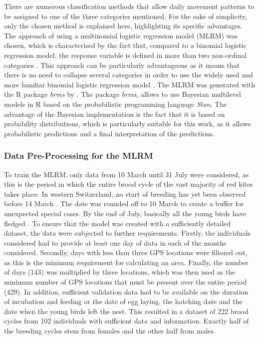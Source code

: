 There are numerous classification methods that allow daily movement patterns to be assigned to one of the three categories mentioned. For the sake of simplicity, only the chosen method is explained here, highlighting its specific advantages. The approach of using a multinomial logistic regression model (MLRM) was chosen, which is characterised by the fact that, compared to a binomial logistic regression model, the response variable is defined in more than two non-ordinal categories \parencite{kwak2002multinomial}. This approach can be particularly advantageous as it means that there is no need to collapse several categories in order to use the widely used and more familiar binomial logistic regression model \parencite{kwak2002multinomial}. The MLRM was generated with the R package \textit{brms} by \textcite{buerkner2017brms}. The package \textit{brms}, allows to use Bayesian multilevel models in R based on the probabilistic programming language \textit{Stan}. The advantage of the Bayesian implementation is the fact that it is based on probability distributions, which is particularly suitable for this work, as it allows probabilistic predictions and a final interpretation of the predictions.



\subsubsection{Data Pre-Processing for the MLRM} \label{subsubsection:mlrm_preprocessing}
To train the MLRM, only data from 10 March until 31 July were considered, as this is the period in which the entire brood cycle of the vast majority of red kites takes place. In western Switzerland, no start of breeding has yet been observed before 14 March \parencite{scherler2023brutbiologie}. The date was rounded off to 10 March to create a buffer for unexpected special cases. By the end of July, basically all the young birds have fledged \parencite{aebischer2021rotmilan}. To ensure that the model was created with a sufficiently detailed dataset, the data were subjected to further requirements. Firstly, the individuals considered had to provide at least one day of data in each of the months considered. Secondly, days with less than three GPS locations were filtered out, as this is the minimum requirement for calculating an area. Finally, the number of days (143) was multiplied by three locations, which was then used as the minimum number of GPS locations that must be present over the entire period (429). In addition, sufficient validation data had to be available on the duration of incubation and feeding or the date of egg laying, the hatching date and the date when the young birds left the nest. This resulted in a dataset of 222 brood cycles from 102 individuals with sufficient data and information. Exactly half of the breeding cycles stem from females and the other half from males.


